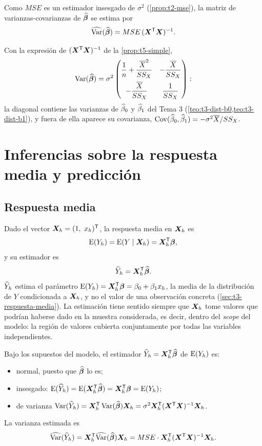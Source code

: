 Como $MSE$ es un estimador insesgado de $\sigma^2$ (\cref{prop:t2-mse}), la matriz de
varianzas-covarianzas de $\widehat{\bm{\beta}}$ se estima por
\[
  \widehat{\operatorname{Var}}(\widehat{\bm{\beta}}) = MSE\,(\bm{X}^{\mathsf{T}}\bm{X})^{-1} .
\]

\begin{proposicion}
  Con la expresión de $(\bm{X}^{\mathsf{T}}\bm{X})^{-1}$ de la \cref{prop:t5-simple},
  \[
    \operatorname{Var}(\widehat{\bm{\beta}}) = \sigma^2\begin{pmatrix}
      \dfrac1n+\dfrac{\overline{X}^2}{SS_X} & -\dfrac{\overline{X}}{SS_X}\\[10pt]
      -\dfrac{\overline{X}}{SS_X} & \dfrac{1}{SS_X}
    \end{pmatrix}:
  \]
  la diagonal contiene las varianzas de $\widehat{\beta}_0$ y $\widehat{\beta}_1$ del Tema 3
  (\cref{teo:t3-dist-b0,teo:t3-dist-b1}), y fuera de ella aparece su covarianza,
  $\operatorname{Cov}(\widehat{\beta}_0,\widehat{\beta}_1)=-\sigma^2\overline{X}/SS_X$.
\end{proposicion}

\section{Inferencias sobre la respuesta media y predicción}
\label{sec:t5-respuesta-media}

\subsection{Respuesta media}

Dado el vector $\vect{X}_h=(1,\ x_h)\T$, la respuesta media en $\bm{X}_h$ es
\[
  \operatorname{E}(Y_h) = \operatorname{E}(Y\mid \bm{X}_h) = \bm{X}_h^{\mathsf{T}}\bm{\beta},
\]
y su estimador es
\[
  \widehat{Y}_h = \bm{X}_h^{\mathsf{T}}\widehat{\bm{\beta}} .
\]
$\widehat{Y}_h$ estima el parámetro $\operatorname{E}(Y_h)=\bm{X}_h^{\mathsf{T}}\bm{\beta}=\beta_0+\beta_1x_h$, la media de la
distribución de $Y$ condicionada a $\bm{X}_h$, y no el valor de una observación concreta
(\cref{sec:t3-respuesta-media}). La estimación tiene sentido siempre que $\bm{X}_h$ tome valores
que podrían haberse dado en la muestra considerada, es decir, dentro del \emph{scope} del modelo:
la región de valores cubierta conjuntamente por todas las variables independientes.

\begin{proposicion}
  Bajo los supuestos del modelo, el estimador $\widehat{Y}_h=\bm{X}_h^{\mathsf{T}}\widehat{\bm{\beta}}$ de $\operatorname{E}(Y_h)$ es:
  \begin{itemize}
    \item normal, puesto que $\widehat{\bm{\beta}}$ lo es;
    \item insesgado: $\operatorname{E}(\widehat{Y}_h)=\operatorname{E}(\bm{X}_h^{\mathsf{T}}\widehat{\bm{\beta}})=\bm{X}_h^{\mathsf{T}}\bm{\beta}=\operatorname{E}(Y_h)$;
    \item de varianza
      $\operatorname{Var}(\widehat{Y}_h)=\bm{X}_h^{\mathsf{T}}\operatorname{Var}(\widehat{\bm{\beta}})\bm{X}_h=\sigma^2\bm{X}_h^{\mathsf{T}}(\bm{X}^{\mathsf{T}}\bm{X})^{-1}\bm{X}_h$.
  \end{itemize}
  La varianza estimada es
  \[
    \widehat{\operatorname{Var}}(\widehat{Y}_h) = \bm{X}_h^{\mathsf{T}}\widehat{\operatorname{Var}}(\widehat{\bm{\beta}})\bm{X}_h
    = MSE\cdot\bm{X}_h^{\mathsf{T}}(\bm{X}^{\mathsf{T}}\bm{X})^{-1}\bm{X}_h .
  \]
\end{proposicion}

